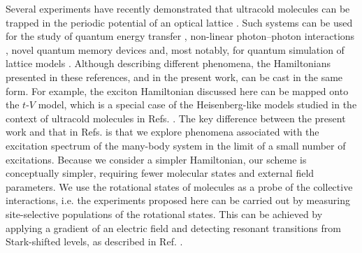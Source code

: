 Several experiments have recently demonstrated that ultracold molecules can be trapped in the periodic potential of an
 optical lattice \cite{umol, umol2, umol3}. Such systems can be used for the study of quantum energy transfer
 \cite{felipe, scholes2006},  non-linear photon--photon interactions \cite{suzanne}, novel quantum memory devices
 \cite{peter-rabl, peter-rabl2} and, most notably, for quantum simulation of lattice models 
\cite{Barnett2006, micheli2006, Brennen2007, Buchler2007, Carr, Carr2, Trefzger2010, Kestner2011, gorshkov, gorshkov2}. 
Although describing different phenomena, the Hamiltonians presented in these references, and in the present work,
 can be cast in the same form. For example, the exciton Hamiltonian discussed here can be mapped onto the $t$-$V$
 model, which is a special case of the Heisenberg-like models studied in the context of ultracold molecules in Refs.
 \cite{micheli2006, Brennen2007, Buchler2007,gorshkov, gorshkov2}. The key difference between the present work and 
 that in Refs. \cite{micheli2006, Brennen2007, Buchler2007,gorshkov, gorshkov2} is that we explore phenomena
 associated with the excitation spectrum of the many-body system in the limit of a small number of excitations.
 Because we consider a simpler Hamiltonian, our scheme is conceptually simpler, requiring fewer molecular states and
 external field parameters.  We use the rotational states of molecules as a probe of the collective interactions, i.e. the
 experiments proposed here can be carried out by measuring site-selective populations of the rotational states. This
 can be achieved by applying a gradient of an electric field and detecting resonant transitions from Stark-shifted
 levels, as described in Ref. \cite{demille}.

